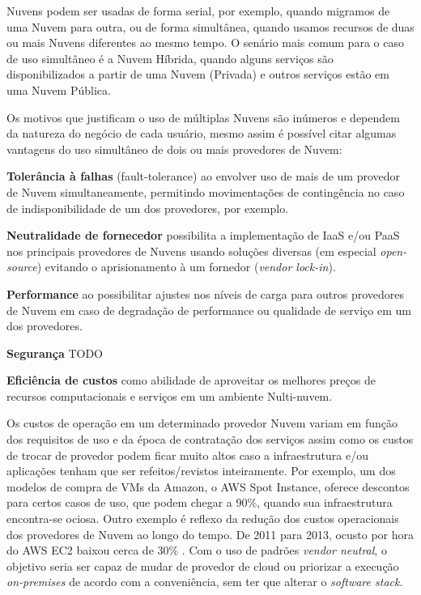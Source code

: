 \documentclass[12pt]{article}
\begin{document}
	Nuvens podem ser usadas de forma serial, por exemplo, quando migramos de uma Nuvem para outra, ou de forma simultânea, quando usamos recursos de duas ou mais Nuvens diferentes ao mesmo tempo. O senário mais comum para o caso de uso simultâneo é a Nuvem Híbrida, quando alguns serviços são disponibilizados a partir de uma Nuvem (Privada) e outros serviços estão em uma Nuvem Pública.
	
	Os motivos que justificam o uso de múltiplas Nuvens são inúmeros e dependem da natureza do negócio de cada usuário, mesmo assim é possível citar algumas vantagens do uso simultâneo de dois ou mais provedores de Nuvem:
	
	\textbf{Tolerância à falhas} (fault-tolerance) ao envolver uso de mais de um provedor de Nuvem simultaneamente, permitindo movimentações de contingência no caso de indisponibilidade de um dos provedores, por exemplo.
	
	\textbf{Neutralidade de fornecedor} possibilita a implementação de IaaS e/ou PaaS nos principais provedores de Nuvens usando soluções diversas (em especial \textit{open-source}) evitando o aprisionamento à um fornedor (\textit{vendor lock-in}).
	
	\textbf{Performance} ao possibilitar ajustes nos níveis de carga para outros provedores de Nuvem em caso de degradação de performance ou qualidade de serviço em um dos provedores.
	
	\textbf{Segurança} TODO
	
	\textbf{Eficiência de custos} como abilidade de aproveitar os melhores preços de recursos computacionais e serviços em um ambiente Nulti-nuvem.
	
	Os custos de operação em um determinado provedor Nuvem variam em função dos requisitos de uso e da época de contratação dos serviços assim como os custos de trocar de provedor podem ficar muito altos caso a infraestrutura e/ou aplicações tenham que ser refeitos/revistos inteiramente. Por exemplo, um dos modelos de compra de VMs da Amazon, o AWS Spot Instance, oferece descontos para certos casos de uso, que podem chegar a 90\%, quando sua infraestrutura encontra-se ociosa. Outro exemplo é reflexo da redução dos custos operacionais dos provedores de Nuvem ao longo do tempo. De 2011 para 2013, ocusto por hora do AWS EC2 baixou cerca de 30\% \cite{Golden:2013}. Com o uso de padrões \textit{vendor neutral}, o objetivo seria ser capaz de mudar de provedor de cloud ou priorizar a execução \textit{on-premises} de acordo com a conveniência, sem ter que alterar o \textit{software stack}.
	
\end{document}
